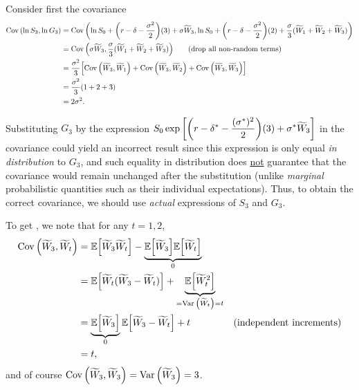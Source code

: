 \begin{enumerate}
Consider first the covariance
\begin{align}
\nonumber\operatorname{Cov}\qty(\ln S_3,\ln G_3)&=\operatorname{Cov}\qty(\ln S_0+\qty(r-\delta-\frac{\sigma^2}{2})(3)+\sigma\widetilde{W}_3,\ln S_0+\qty(r-\delta-\frac{\sigma^2}{2})(2)+\frac{\sigma}{3}(\widetilde{W}_1+\widetilde{W}_2+\widetilde{W}_3)
) \\
\nonumber&=\operatorname{Cov}\qty(\sigma\widetilde{W}_3,\frac{\sigma}{3}(\widetilde{W}_1+\widetilde{W}_2+\widetilde{W}_3))\qquad\text{(drop all non-random terms)} \\
\nonumber&=\frac{\sigma^2}{3}\qty[\operatorname{Cov}\qty(\widetilde{W}_3,\widetilde{W}_1)+\operatorname{Cov}\qty(\widetilde{W}_3,\widetilde{W}_2)+\operatorname{Cov}\qty(\widetilde{W}_3,\widetilde{W}_3)] \\
\label{eq:brown-cov-min}&=\frac{\sigma^2}{3}(1+2+3) \\
\nonumber&=2\sigma^2.
\end{align}
\begin{warning}
Substituting \(G_3\) by the expression \(\displaystyle
S_0\exp\qty[\qty(r-\delta^{*}-\frac{(\sigma^{*})^2}{2})(3)+\sigma^{*}\widetilde{W}_3]\)
in the covariance could yield an incorrect result since this expression is only
equal \emph{in distribution} to \(G_3\), and such equality in distribution does
\underline{not} guarantee that the covariance would remain unchanged after the
substitution (unlike \emph{marginal} probabilistic quantities such as their
individual expectations). Thus, to obtain the correct covariance, we should use
\emph{actual} expressions of \(S_3\) and \(G_3\).
\end{warning}

To get , we note that for any \(t=1,2\),
\begin{align*}
\operatorname{Cov}\qty(\widetilde{W}_3,\widetilde{W}_t)
&=\mathbb{E}\qty[\widetilde{W}_3\widetilde{W}_t]-\underbrace{\mathbb{E}\qty[\widetilde{W}_3]\mathbb{E}\qty[\widetilde{W}_t]}_{0} \\
&=\mathbb{E}\qty[\widetilde{W}_t(\widetilde{W}_3-\widetilde{W}_t)]+\underbrace{\mathbb{E}\qty[\widetilde{W}_t^2]}_{=\operatorname{Var}\qty(\widetilde{W}_t)=t} \\
&=\underbrace{\mathbb{E}\qty[\widetilde{W}_3]}_{0}\mathbb{E}\qty[\widetilde{W}_3-\widetilde{W}_t]+t&\text{(independent increments)} \\
&=t,
\end{align*}
and of course
\(\operatorname{Cov}\qty(\widetilde{W}_3,\widetilde{W}_3)=\operatorname{Var}\qty(\widetilde{W}_3)=3\).


\end{enumerate}
